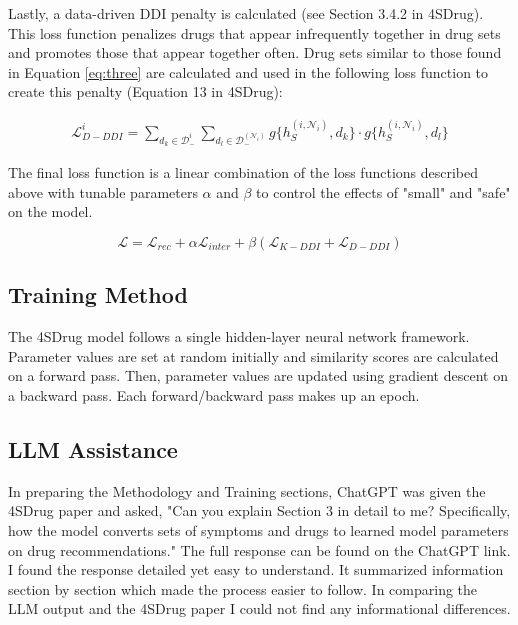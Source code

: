 \documentclass[letterpaper]{article} %
\begin{document}
Lastly, a data-driven DDI penalty is calculated (see Section 3.4.2 in 4SDrug). This loss function penalizes drugs that appear infrequently together in drug sets and promotes those that appear together often. Drug sets similar to those found in Equation \ref{eq:three} are calculated and used in the following loss function to create this penalty (Equation 13 in 4SDrug):

\begin{multline}
\mathcal{L}_{D-DDI}^{i} = \sum_{d_k\in\mathcal{D}_-^{i}}\sum_{d_l\in\mathcal{D}_-^{(\mathcal{N}_i)}}{g\{h_S^{(i,\mathcal{N}_i)},d_k\}} \cdot {g\{h_S^{(i,\mathcal{N}_i)},d_l\}}
    \label{eq:kbddi}
\end{multline}

The final loss function is a linear combination of the loss functions described above with tunable parameters $\alpha$ and $\beta$ to control the effects of "small" and "safe" on the model.

\begin{equation}
\mathcal{L} = \mathcal{L}_{rec} + \alpha\mathcal{L}_{inter} + \beta(\mathcal{L}_{K-DDI}+\mathcal{L}_{D-DDI})
    \label{eq:total_loss}
\end{equation}

\subsection{Training Method}

The 4SDrug model follows a single hidden-layer neural network framework. Parameter values are set at random initially and similarity scores are calculated on a forward pass. Then, parameter values are updated using gradient descent on a backward pass. Each forward/backward pass makes up an epoch.

\subsection{LLM Assistance}

In preparing the Methodology and Training sections, ChatGPT was given the 4SDrug paper and asked, "Can you explain Section 3 in detail to me? Specifically, how the model converts sets of symptoms and drugs to learned model parameters on drug recommendations." The full response can be found on the ChatGPT link. I found the response detailed yet easy to understand. It summarized information section by section which made the process easier to follow. In comparing the LLM output and the 4SDrug paper I could not find any informational differences.
\end{document}
